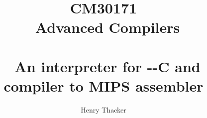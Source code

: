 \documentclass[a4paper,11pt]{report}
\title{\textbf{CM30171 \\ \ Advanced Compilers} \\ \ \\ \ An interpreter for -{}-C and compiler to MIPS assembler}
\author{Henry Thacker}
\begin{document}
\maketitle

\tableofcontents





{}
\end{document}

